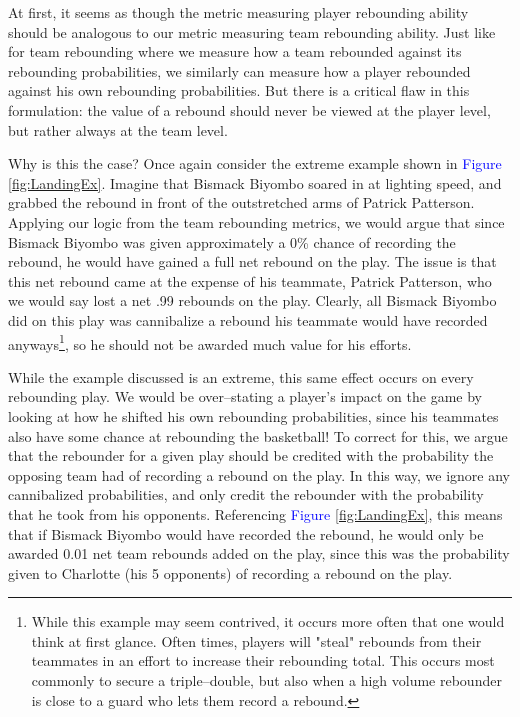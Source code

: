 \documentclass{article}
\begin{document}
\bigbreak
\noindent
At first, it seems as though the metric measuring player rebounding ability should be analogous to our metric measuring team rebounding ability. Just like for team rebounding where we measure how a team rebounded against its rebounding probabilities, we similarly can measure how a player rebounded against his own rebounding probabilities. But there is a critical flaw in this formulation: the value of a rebound should never be viewed at the player level, but rather always at the team level. 

\bigbreak
\noindent
Why is this the case? Once again consider the extreme example shown in \textcolor{blue}{Figure} \ref{fig:LandingEx}. Imagine that Bismack Biyombo soared in at lighting speed, and grabbed the rebound in front of the outstretched arms of Patrick Patterson. Applying our logic from the team rebounding metrics, we would argue that since Bismack Biyombo was given approximately a 0\% chance of recording the rebound, he would have gained a full net rebound on the play. The issue is that this net rebound came at the expense of his teammate, Patrick Patterson, who we would say lost a net .99 rebounds on the play. Clearly, all Bismack Biyombo did on this play was cannibalize a rebound his teammate would have recorded anyways\footnote{While this example may seem contrived, it occurs more often that one would think at first glance. Often times, players will "steal" rebounds from their teammates in an effort to increase their rebounding total. This occurs most commonly to secure a triple--double, but also when a high volume rebounder is close to a guard who lets them record a rebound.}, so he should not be awarded much value for his efforts.

\bigbreak
\noindent
While the example discussed is an extreme, this same effect occurs on every rebounding play. We would be over--stating a player's impact on the game by looking at how he shifted his own rebounding probabilities, since his teammates also have some chance at rebounding the basketball! To correct for this, we argue that the rebounder for a given play should be credited with the probability the opposing team had of recording a rebound on the play. In this way, we ignore any cannibalized probabilities, and only credit the rebounder with the probability that he took from his opponents. Referencing \textcolor{blue}{Figure} \ref{fig:LandingEx}, this means that if Bismack Biyombo would have recorded the rebound, he would only be awarded 0.01 net team rebounds added on the play, since this was the probability given to Charlotte (his 5 opponents) of recording a rebound on the play.
 
\end{document}
